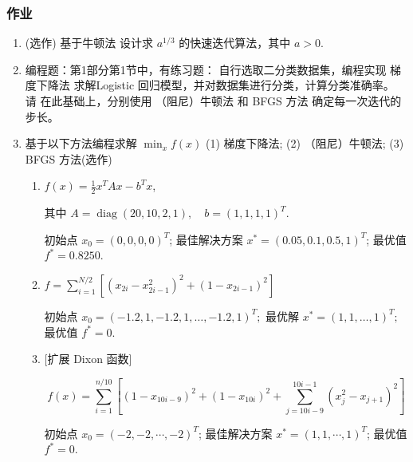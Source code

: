 \documentclass[handout,10pt]{beamer} %
\begin{document}
\begin{frame}[allowframebreaks]
  \frametitle{作业}
  
  \begin{enumerate}
  	\item (选作) 基于牛顿法 设计求 $a^{1/3}$ 的快速迭代算法，其中 $a>0$. 
  	\item 	编程题：第1部分第1节中，有练习题： 自行选取二分类数据集，编程实现 梯度下降法 求解Logistic 回归模型，并对数据集进行分类，计算分类准确率。
  	请 在此基础上，分别使用  （阻尼）牛顿法 
  	和 BFGS 方法 确定每一次迭代的步长。 
  	
  	\item 
  基于以下方法编程求解 $\min_x f(x)$
  (1) 梯度下降法;
  (2) （阻尼）牛顿法;
  (3) BFGS 方法(选作)

  \begin{enumerate}
    \item   $    f(x)=\frac{1}{2} x^{T} A x-b^{T} x$,

    其中 $A=\operatorname{diag}(20,10,2,1), \quad b=(1,1,1,1)^{T}$.

初始点 $x_{0}=(0,0,0,0)^{T}$;
最佳解决方案  $x^{*}=(0.05,0.1,0.5,1)^{T}$;
最优值 $f^{*}=0.8250$.



\item  $  f=\sum_{i=1}^{N / 2}\left[\left(x_{2 i}-x_{2 i-1}^{2}\right)^{2}+\left(1-x_{2 i-1}\right)^{2}\right]$


初始点 $x_{0}=(-1.2,1,-1.2,1, \ldots,-1.2,1)^{T} ;$
	最优解  $x^{*}=(1,1, \ldots, 1)^{T} ;$
最优值  $f^{*}=0$.
 
 
 \item  {}  [扩展 Dixon 函数]
 
 $$
  f(x)=\sum_{i=1}^{n / 10}\left[\left(1-x_{10 i-9}\right)^{2}+\left(1-x_{10 i}\right)^{2}+\sum_{j=10 i-9}^{10 i-1}\left(x_{j}^{2}-x_{j+1}\right)^{2}\right]
$$

初始点 $x_{0}=(-2,-2, \cdots,-2)^{T}$; 
最佳解决方案 $x^{*}=(1,1, \cdots, 1)^{T}$; 
 最优值 $f^{*}=0$.

  \end{enumerate}


\end{enumerate}
\end{frame}


 

\end{document}
